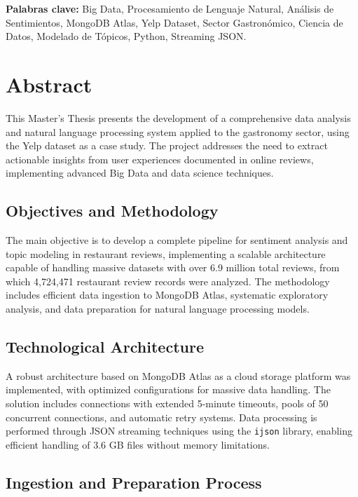 \documentclass[12pt,a4paper,twoside,openany]{book}
\begin{document}
\vspace{1cm}

\textbf{Palabras clave:} Big Data, Procesamiento de Lenguaje Natural, Análisis de Sentimientos, MongoDB Atlas, Yelp Dataset, Sector Gastronómico, Ciencia de Datos, Modelado de Tópicos, Python, Streaming JSON.

\chapter*{Abstract}

This Master's Thesis presents the development of a comprehensive data analysis and natural language processing system applied to the gastronomy sector, using the Yelp dataset as a case study. The project addresses the need to extract actionable insights from user experiences documented in online reviews, implementing advanced Big Data and data science techniques.

\section*{Objectives and Methodology}

The main objective is to develop a complete pipeline for sentiment analysis and topic modeling in restaurant reviews, implementing a scalable architecture capable of handling massive datasets with over 6.9 million total reviews, from which 4,724,471 restaurant review records were analyzed. The methodology includes efficient data ingestion to MongoDB Atlas, systematic exploratory analysis, and data preparation for natural language processing models.

\section*{Technological Architecture}

A robust architecture based on MongoDB Atlas as a cloud storage platform was implemented, with optimized configurations for massive data handling. The solution includes connections with extended 5-minute timeouts, pools of 50 concurrent connections, and automatic retry systems. Data processing is performed through JSON streaming techniques using the \texttt{ijson} library, enabling efficient handling of 3.6 GB files without memory limitations.

\section*{Ingestion and Preparation Process}
\end{document}
